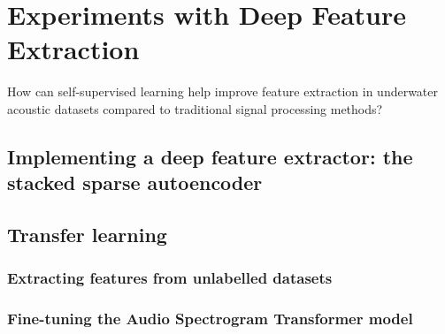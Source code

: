 \chapter{Experiments with Deep Feature Extraction}

\begin{researchquestion}
How can self-supervised learning help improve feature extraction in underwater acoustic datasets compared to traditional signal processing methods?
\end{researchquestion}

\section{Implementing a deep feature extractor: the stacked sparse autoencoder}

\section{Transfer learning}

\subsection{Extracting features from unlabelled datasets}

\subsection{Fine-tuning the Audio Spectrogram Transformer model}


